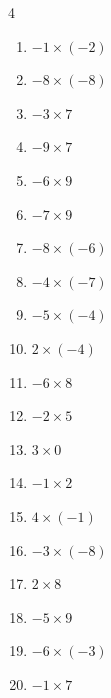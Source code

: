 \begin{multicols}{4}
\begin{enumerate}
  \item $-1\times (-2)$
        \phantom{$=2$}

  \item $-8\times (-8)$
        \phantom{$=64$}

  \item $-3\times 7$
        \phantom{$=-21$}

  \item $-9\times 7$
        \phantom{$=-63$}

  \item $-6\times 9$
        \phantom{$=-54$}

  \item $-7\times 9$
        \phantom{$=-63$}

  \item $-8\times (-6)$
        \phantom{$=48$}

  \item $-4\times (-7)$
        \phantom{$=28$}

  \item $-5\times (-4)$
        \phantom{$=20$}

  \item $2\times (-4)$
        \phantom{$=-8$}

  \item $-6\times 8$
        \phantom{$=-48$}

  \item $-2\times 5$
        \phantom{$=-10$}

  \item $3\times 0$
        \phantom{$=0$}

\columnbreak %

  \item $-1\times 2$
        \phantom{$=-2$}

  \item $4\times (-1)$
        \phantom{$=-4$}

  \item $-3\times (-8)$
        \phantom{$=24$}

  \item $2\times 8$
        \phantom{$=16$}

  \item $-5\times 9$
        \phantom{$=-45$}

  \item $-6\times (-3)$
        \phantom{$=18$}

  \item $-1\times 7$
        \phantom{$=-7$}


\end{enumerate}
\end{multicols}
